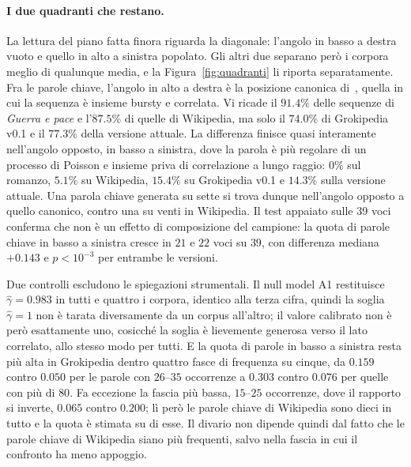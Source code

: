 \paragraph{I due quadranti che restano.} La lettura del piano fatta finora
riguarda la diagonale: l'angolo in basso a destra vuoto e quello in alto a
sinistra popolato. Gli altri due separano però i corpora meglio di qualunque
media, e la Figura~\ref{fig:quadranti} li riporta separatamente. Fra le parole
chiave, l'angolo in alto a destra è la posizione canonica
di~\cite{altmann2012}, quella in cui la sequenza è insieme bursty e correlata.
Vi ricade il $91.4\%$ delle sequenze di \emph{Guerra e pace} e l'$87.5\%$ di
quelle di Wikipedia, ma solo il $74.0\%$ di Grokipedia v0.1 e il $77.3\%$
della versione attuale. La differenza finisce quasi interamente nell'angolo
opposto, in basso a sinistra, dove la parola è più regolare di un processo di
Poisson e insieme priva di correlazione a lungo raggio: $0\%$ sul romanzo,
$5.1\%$ su Wikipedia, $15.4\%$ su Grokipedia v0.1 e $14.3\%$ sulla versione
attuale. Una parola chiave generata su sette si trova dunque nell'angolo
opposto a quello canonico, contro una su venti in Wikipedia. Il test appaiato
sulle \num{39} voci conferma che non è un effetto di composizione del
campione: la quota di parole chiave in basso a sinistra cresce in $21$ e $22$
voci su $39$, con differenza mediana $+0.143$ e $p < 10^{-3}$ per entrambe le
versioni.

Due controlli escludono le spiegazioni strumentali. Il null model A1
restituisce $\hat\gamma = 0.983$ in tutti e quattro i corpora, identico alla
terza cifra, quindi la soglia $\hat\gamma = 1$ non è tarata diversamente da un
corpus all'altro; il valore calibrato non è però esattamente uno, cosicché la
soglia è lievemente generosa verso il lato correlato, allo stesso modo per
tutti. E la quota di parole in basso a sinistra resta più alta in Grokipedia
dentro quattro fasce di frequenza su cinque, da $0.159$ contro $0.050$ per le
parole con $26$--$35$ occorrenze a $0.303$ contro $0.076$ per quelle con più di
$80$. Fa eccezione la fascia più bassa, $15$--$25$ occorrenze, dove il rapporto
si inverte, $0.065$ contro $0.200$; lì però le parole chiave di Wikipedia sono
dieci in tutto e la quota è stimata su di esse. Il divario non dipende quindi
dal fatto che le parole chiave di Wikipedia siano più frequenti, salvo nella
fascia in cui il confronto ha meno appoggio.

